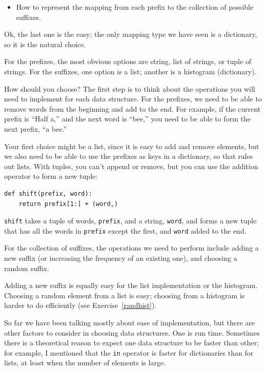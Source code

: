 \documentclass[10pt]{book}
\begin{document}
\begin{CJK}{UTF8}{gbsn}
\begin{itemize}
\item How to represent the mapping from each prefix to
the collection of possible suffixes.

\end{itemize}

Ok, the last one is the easy; the only mapping type we have
seen is a dictionary, so it is the natural choice.

For the prefixes, the most obvious options are string,
list of strings, or tuple of strings.  For the suffixes,
one option is a list; another is a histogram (dictionary).

How should you choose?  The first step is to think about
the operations you will need to implement for each data structure.
For the prefixes, we need to be able to remove words from
the beginning and add to the end.  For example, if the current
prefix is ``Half a,'' and the next word is ``bee,'' you need
to be able to form the next prefix, ``a bee.''

Your first choice might be a list, since it is easy to add
and remove elements, but we also need to be able to use the
prefixes as keys in a dictionary, so that rules out lists.
With tuples, you can't append or remove, but you can use
the addition operator to form a new tuple:

\begin{verbatim}
def shift(prefix, word):
    return prefix[1:] + (word,)
\end{verbatim}
%
{\tt shift} takes a tuple of words, {\tt prefix}, and a string, 
{\tt word}, and forms a new tuple that has all the words
in {\tt prefix} except the first, and {\tt word} added to
the end.

For the collection of suffixes, the operations we need to
perform include adding a new suffix (or increasing the frequency
of an existing one), and choosing a random suffix.

Adding a new suffix is equally easy for the list implementation
or the histogram.  Choosing a random element from a list
is easy; choosing from a histogram is harder to do
efficiently (see Exercise~\ref{randhist}).

So far we have been talking mostly about ease of implementation,
but there are other factors to consider in choosing data structures.
One is run time.  Sometimes there is a theoretical reason to expect
one data structure to be faster than other; for example, I mentioned
that the {\tt in} operator is faster for dictionaries than for lists,
at least when the number of elements is large.


\end{CJK}
\end{document}
